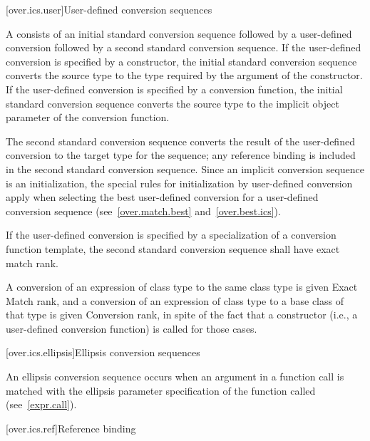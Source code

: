 [over.ics.user]{User-defined conversion sequences}

\pnum
A  consists of an initial
standard conversion sequence followed by a user-defined
conversion followed by a second standard
conversion sequence.
If the user-defined conversion is specified
by a constructor, the initial standard
conversion sequence converts the source type to the type required
by the argument of the constructor.
If the user-defined
conversion is specified by a conversion function, the
initial standard conversion sequence
converts the source type to the implicit object parameter of the
conversion function.

\pnum
The second standard conversion sequence converts the result of
the user-defined conversion to the target type for the sequence;
any reference binding is included in the second standard
conversion sequence.
Since an implicit conversion sequence is an initialization, the
special rules for initialization by user-defined conversion apply
when selecting the best user-defined conversion for a
user-defined conversion sequence (see~\ref{over.match.best} and~\ref{over.best.ics}).

\pnum
If the user-defined conversion is specified by a
specialization of a conversion function template,
the second standard conversion sequence shall have exact match rank.

\pnum
A conversion of an expression of class type
to the same class type is given Exact Match rank, and
a conversion of an expression of class type
to a base class of that type is given Conversion rank,
in spite of the
fact that a constructor (i.e., a user-defined conversion
function) is called for those cases.

[over.ics.ellipsis]{Ellipsis conversion sequences}

\pnum
{}%
An ellipsis conversion sequence occurs when an argument in a
function call is matched with the ellipsis parameter
specification of the function called (see~\ref{expr.call}).

[over.ics.ref]{Reference binding}

